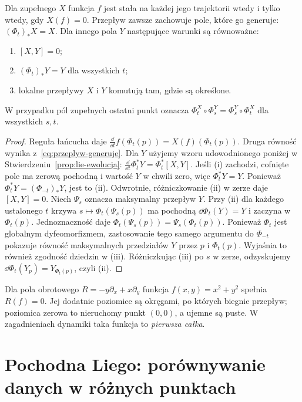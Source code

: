 \begin{stwierdzenie}\label{prop:inwarianty}
Dla zupełnego $X$ funkcja $f$ jest stała na każdej jego trajektorii
wtedy i tylko wtedy, gdy $X(f)=0$. Przepływ zawsze zachowuje
pole, które go generuje: $(\Phi_t)_*X=X$.
Dla innego pola $Y$ następujące warunki są równoważne:
\begin{enumerate}[label=(\roman*)]
\item $[X,Y]=0$;
\item $(\Phi_t)_*Y=Y$ dla wszystkich $t$;
\item lokalne przepływy $X$ i $Y$ komutują tam, gdzie są określone.
\end{enumerate}
W przypadku pól zupełnych ostatni punkt oznacza
$\Phi_t^X\circ\Phi_s^Y=\Phi_s^Y\circ\Phi_t^X$ dla wszystkich $s,t$.
\end{stwierdzenie}
\begin{proof}
Reguła łańcucha daje
$\frac{\dd}{\dd t}f(\Phi_t(p))=X(f)(\Phi_t(p))$.
Druga równość wynika z~\eqref{eq:przeplyw-generuje}.
Dla $Y$ użyjemy wzoru udowodnionego poniżej w
Stwierdzeniu~\ref{prop:lie-ewolucja}:
$\frac{\dd}{\dd t}\Phi_t^*Y=\Phi_t^*[X,Y]$.
Jeśli (i) zachodzi, cofnięte pole ma zerową pochodną
i wartość $Y$ w chwili zero, więc $\Phi_t^*Y=Y$.
Ponieważ $\Phi_t^*Y=(\Phi_{-t})_*Y$, jest to (ii).
Odwrotnie, różniczkowanie (ii) w zerze daje $[X,Y]=0$.
Niech $\Psi_s$ oznacza maksymalny przepływ $Y$. Przy (ii)
dla każdego ustalonego $t$ krzywa $s\mapsto\Phi_t(\Psi_s(p))$
ma pochodną $\dd\Phi_t(Y)=Y$ i zaczyna w $\Phi_t(p)$.
Jednoznaczność daje $\Phi_t(\Psi_s(p))=\Psi_s(\Phi_t(p))$.
Ponieważ $\Phi_t$ jest globalnym dyfeomorfizmem, zastosowanie
tego samego argumentu do $\Phi_{-t}$ pokazuje równość
maksymalnych przedziałów $Y$ przez $p$ i $\Phi_t(p)$.
Wyjaśnia to również zgodność dziedzin w (iii).
Różniczkując (iii) po $s$ w zerze, odzyskujemy
$\dd\Phi_t(Y_p)=Y_{\Phi_t(p)}$, czyli (ii).
\end{proof}

\begin{przyklad}
Dla pola obrotowego $R=-y\partial_x+x\partial_y$
funkcja $f(x,y)=x^2+y^2$ spełnia $R(f)=0$.
Jej dodatnie poziomice są okręgami, po których biegnie przepływ;
poziomica zerowa to nieruchomy punkt $(0,0)$, a ujemne są puste.
W zagadnieniach dynamiki taka funkcja to \emph{pierwsza całka}.
\end{przyklad}

\section{Pochodna Liego: porównywanie danych w różnych punktach}
\label{sec:liego}

